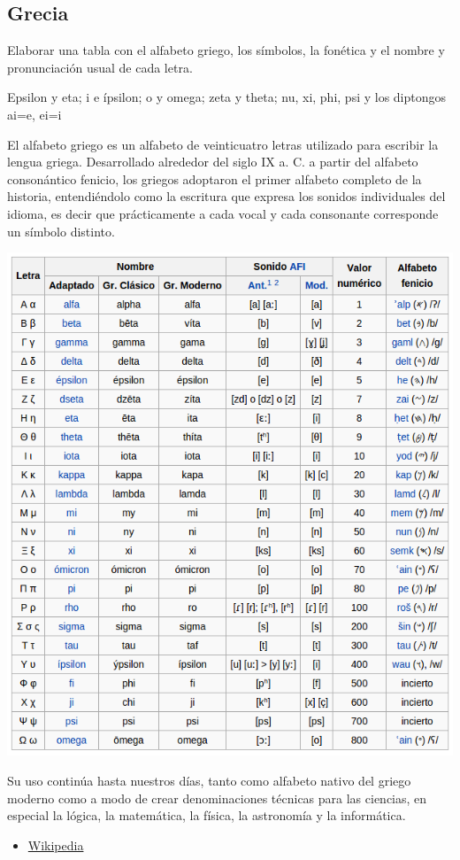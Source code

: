 \subsection{Grecia}
\begin{problem}[5]
Elaborar una tabla con el alfabeto griego, los símbolos, la fonética y el nombre y pronunciación usual de cada letra.

\obs Epsilon y eta; i e ípsilon; o y omega; zeta y theta; nu, xi, phi, psi y los diptongos ai=e, ei=i

\solution

El alfabeto griego es un alfabeto de veinticuatro letras utilizado para escribir la lengua griega. Desarrollado alrededor del siglo IX a. C. a partir del alfabeto consonántico fenicio, los griegos adoptaron el primer alfabeto completo de la historia, entendiéndolo como la escritura que expresa los sonidos individuales del idioma, es decir que prácticamente a cada vocal y cada consonante corresponde un símbolo distinto.

\begin{center}
\includegraphics[width=0.5\linewidth]{img/alfabeto_griego.png}
\end{center}


Su uso continúa hasta nuestros días, tanto como alfabeto nativo del griego moderno como a modo de crear denominaciones técnicas para las ciencias, en especial la lógica, la matemática, la física, la astronomía y la informática.


\begin{itemize}
\item \href{https://es.wikipedia.org/wiki/Alfabeto_griego}{Wikipedia}
\end{itemize}


\end{problem}

